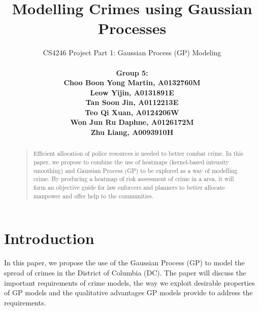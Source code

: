 \documentclass[letterpaper]{article}
\begin{document}
	\title{Modelling Crimes using Gaussian Processes}
	\author{CS4246 Project Part 1: Gaussian Process (GP) Modeling  \\ \\
	\bf \small Group 5:\\
	\small Choo Boon Yong Martin, A0132760M\\
	\small Leow Yijin, A0131891E\\
	\small Tan Soon Jin, A0112213E\\
	\small Teo Qi Xuan, A0124206W\\
	\small Won Jun Ru Daphne, A0126172M\\
	\small Zhu Liang, A0093910H\\
	}	
	
	
	\maketitle
	\thispagestyle{empty}
	\pagestyle{empty}
	
	
	
	\begin{abstract}
	\begin{quote}
		Efficient allocation of police resources is needed to better combat crime. In this paper, we propose to combine the use of heatmaps (kernel-based intensity smoothing) and Gaussian Process (GP) to be explored as a way of modelling crime. By producing a heatmap of risk assessment of crime in a area, it will form an objective guide for law enforcers and planners to better allocate manpower and offer help to the communities.
	\end{quote}
	\end{abstract}
	
	
	\section{Introduction}
	
	In this paper, we propose the use of the Gaussian Process (GP) to model the spread of crimes in the District of Columbia (DC).
	The paper will discuss the important requirements of crime models, the way we exploit desirable properties of GP models and the qualitative advantages GP models provide to address the requirements.\\ \\
\end{document}
